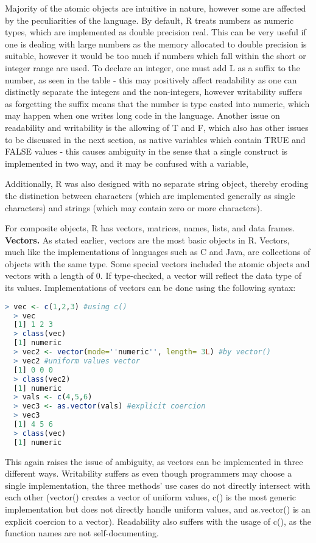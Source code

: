 \documentclass[12pt]{article}
\begin{document}
Majority of the atomic objects are intuitive in nature, however some are affected by the peculiarities of the language. By default, R treats numbers as numeric types, which are implemented as double precision real. This can be very useful if one is dealing with large numbers as the memory allocated to double precision is suitable, however it would be too much if numbers which fall within the short or integer range are used. To declare an integer, one must add L as a suffix to the number, as seen in the table - this may positively affect readability as one can distinctly separate the integers and the non-integers, however writability suffers as forgetting the suffix means that the number is type casted into numeric, which may happen when one writes long code in the language. Another issue on readability and writability is the allowing of T and F, which also has other issues to be discussed in the next section, as native variables which contain TRUE and FALSE values - this causes ambiguity in the sense that a single construct is implemented in two way, and it may be confused with a variable,


Additionally, R was also designed with no separate string object, thereby eroding the distinction between characters (which are implemented generally as single characters) and strings (which may contain zero or more characters).

For composite objects, R has vectors, matrices, names, lists, and data frames. \\

\textbf{Vectors.} As stated earlier, vectors are the most basic objects in R. Vectors, much like the implementations of languages such as C and Java, are collections of objects with the same type. Some special vectors included the atomic objects and vectors with a length of 0. If type-checked, a vector will reflect the data type of its values. Implementations of vectors can be done using the following syntax:

\begin{lstlisting}[language=R]
  > vec <- c(1,2,3) #using c()
  > vec
  [1] 1 2 3
  > class(vec)
  [1] numeric
  > vec2 <- vector(mode=''numeric'', length= 3L) #by vector()
  > vec2 #uniform values vector
  [1] 0 0 0
  > class(vec2)
  [1] numeric
  > vals <- c(4,5,6)
  > vec3 <- as.vector(vals) #explicit coercion
  > vec3
  [1] 4 5 6
  > class(vec)
  [1] numeric
\end{lstlisting}

This again raises the issue of ambiguity, as vectors can be implemented in three different ways. Writability suffers as even though programmers may choose a single implementation, the three methods' use cases do not directly intersect with each other (vector() creates a vector of uniform values, c() is the most generic implementation but does not directly handle uniform values, and as.vector() is an explicit coercion to a vector). Readability also suffers with the usage of c(), as the function names are not self-documenting.\\
\end{document}
